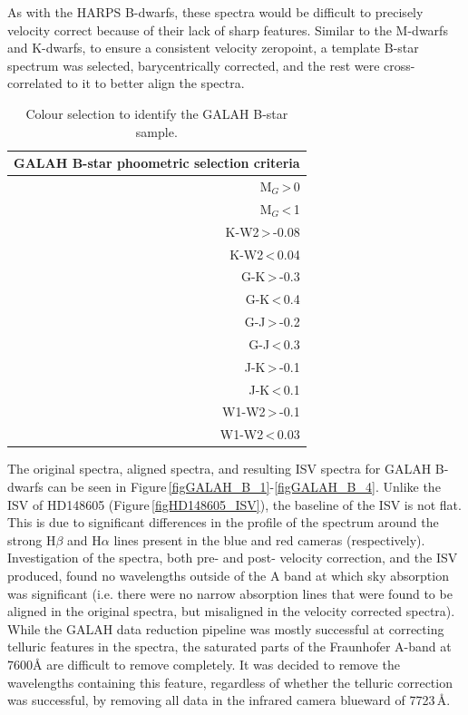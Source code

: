 As with the HARPS B-dwarfs, these spectra would be difficult to precisely velocity correct because of their lack of sharp features. Similar to the M-dwarfs and K-dwarfs, to ensure a consistent velocity zeropoint, a template B-star spectrum was selected, barycentrically corrected, and the rest were cross-correlated to it to better align the spectra.\\

\begin{table}[]
    \centering
    \begin{tabular}{|r|}
        \hline
        GALAH B-star phoometric selection criteria\\
        \hline
		M$_G$\,\textgreater\,0\\
		M$_G$\,\textless\,1\\
        K-W2\,\textgreater\,-0.08\\
        K-W2\,\textless\,0.04\\
        G-K\,\textgreater\,-0.3\\
        G-K\,\textless\,0.4\\
    	G-J\,\textgreater\,-0.2\\
    	G-J\,\textless\,0.3\\
    	J-K\,\textgreater\,-0.1\\
    	J-K\,\textless\,0.1\\
		W1-W2\,\textgreater\,-0.1\\
    	W1-W2\,\textless\,0.03\\
        \hline
    \end{tabular}
    \caption{Colour selection to identify the GALAH B-star sample.}
    \label{eqBD}
\end{table}


The original spectra, aligned spectra, and resulting ISV spectra for GALAH B-dwarfs can be seen in Figure\,\ref{figGALAH_B_1}-\ref{figGALAH_B_4}. Unlike the ISV of HD148605 (Figure\,\ref{figHD148605_ISV}), the baseline of the ISV is not flat. This is due to significant differences in the profile of the spectrum around the strong H$\beta$ and H$\alpha$ lines present in the blue and red cameras (respectively). Investigation of the spectra, both pre- and post- velocity correction, and the ISV produced, found no wavelengths outside of the A band at which sky absorption was significant (i.e. there were no narrow absorption lines that were found to be aligned in the original spectra, but misaligned in the velocity corrected spectra). While the GALAH data reduction pipeline was mostly successful at correcting telluric features in the spectra, the saturated parts of the Fraunhofer A-band at 7600\hbox{\AA} are difficult to remove completely. It was decided to remove the wavelengths containing this feature, regardless of whether the telluric correction was successful, by removing all data in the infrared camera blueward of 7723\,\hbox{\AA}.\\  

